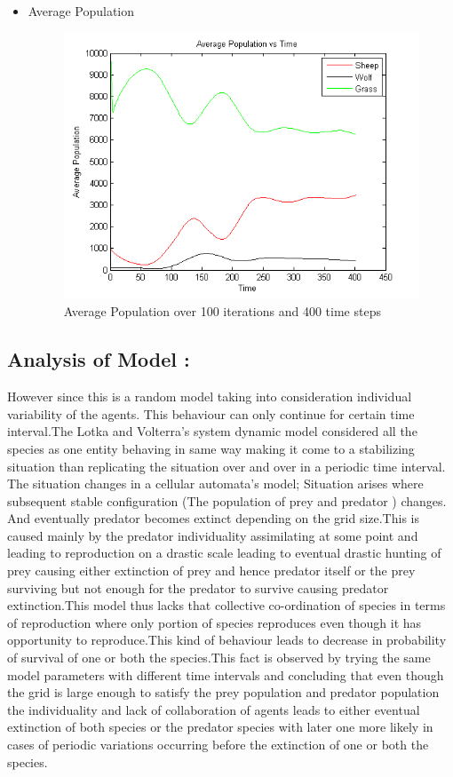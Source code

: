 \documentclass[prl,12pt,citeautoscript,reprint]{revtex4-1}
\begin{document}
\begin{itemize}
\item Average Population 
\begin{figure}[H]
\centering
\includegraphics[width = 0.8\columnwidth]{3c} 
 
\caption{Average Population over 100 iterations and 400 time steps}\label{Fig:Cellular matrix at 600 time step}
\end{figure}

\end{itemize}
\subsection{Analysis of Model :}

However since this is a random model taking into consideration individual variability of the agents. This behaviour can only continue for certain time interval.The Lotka and Volterra's system dynamic model considered all the species as one entity behaving in same way making it come to a stabilizing situation than replicating the situation over and over in a periodic time interval. The situation changes in a cellular automata's model; Situation arises where subsequent stable configuration (The population of prey and predator ) changes. And eventually predator becomes extinct depending on the grid size.This is caused mainly by the predator individuality assimilating at some point and leading to reproduction on a drastic scale leading to eventual drastic hunting of prey causing either extinction of prey and hence predator itself or the prey surviving but not enough for the predator to survive causing predator extinction.This model thus lacks that collective co-ordination of species in terms of reproduction where only portion of species reproduces even though it has opportunity to reproduce.This kind of behaviour leads to decrease in probability of survival of one or both the species.This fact is observed by trying the same model parameters with different time intervals and concluding that even though the grid is large enough to satisfy the prey population and predator population the individuality and lack of collaboration of agents leads to either eventual extinction of both species or the predator species with later one more likely in cases of periodic variations occurring before the extinction of one or both the species.
\end{document}
